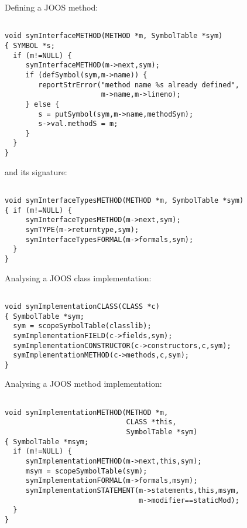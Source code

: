 \begin{slide*}
Defining a JOOS method:

\begin{scriptsize}
\begin{verbatim}

void symInterfaceMETHOD(METHOD *m, SymbolTable *sym)
{ SYMBOL *s;
  if (m!=NULL) {
     symInterfaceMETHOD(m->next,sym);
     if (defSymbol(sym,m->name)) {
        reportStrError("method name %s already defined",
                       m->name,m->lineno);
     } else {
        s = putSymbol(sym,m->name,methodSym);
        s->val.methodS = m;
     }
  }   
}
\end{verbatim}
\end{scriptsize}

and its signature:

\begin{scriptsize}
\begin{verbatim}

void symInterfaceTypesMETHOD(METHOD *m, SymbolTable *sym)
{ if (m!=NULL) {
     symInterfaceTypesMETHOD(m->next,sym);
     symTYPE(m->returntype,sym);
     symInterfaceTypesFORMAL(m->formals,sym);
  }
}
\end{verbatim}
\end{scriptsize}
\vfil
\end{slide*}
 
\begin{slide*}
Analysing a JOOS class implementation:

\begin{scriptsize}
\begin{verbatim}

void symImplementationCLASS(CLASS *c)
{ SymbolTable *sym;
  sym = scopeSymbolTable(classlib);
  symImplementationFIELD(c->fields,sym);
  symImplementationCONSTRUCTOR(c->constructors,c,sym);
  symImplementationMETHOD(c->methods,c,sym);
}

\end{verbatim}
\end{scriptsize}

Analysing a JOOS method implementation:
 
\begin{scriptsize}
\begin{verbatim}

void symImplementationMETHOD(METHOD *m, 
                             CLASS *this, 
                             SymbolTable *sym)
{ SymbolTable *msym;
  if (m!=NULL) {
     symImplementationMETHOD(m->next,this,sym);
     msym = scopeSymbolTable(sym);
     symImplementationFORMAL(m->formals,msym);
     symImplementationSTATEMENT(m->statements,this,msym,
                                m->modifier==staticMod);
  }
}
\end{verbatim}
\end{scriptsize}
\vfil
\end{slide*}
 
